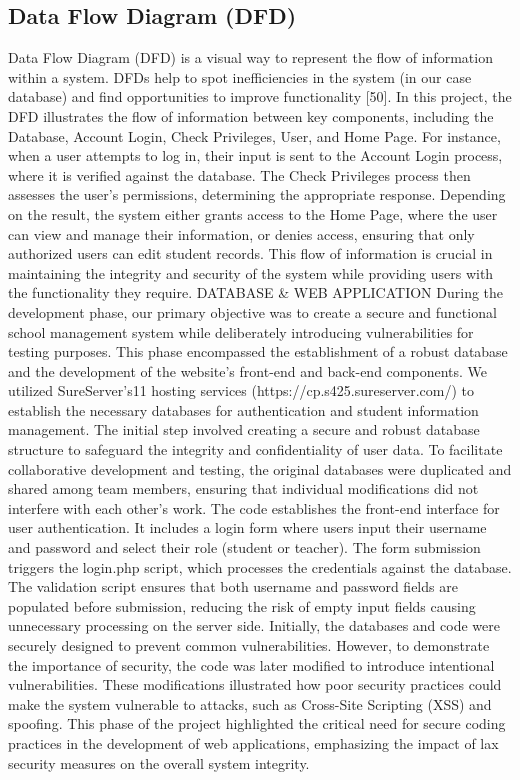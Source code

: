 \documentclass[letterpaper,twocolumn]{article}
\begin{document}
\subsection{Data Flow Diagram (DFD)}
Data Flow Diagram (DFD) is a visual way to represent the flow of information within a system. DFDs help to spot inefficiencies in the system (in our case database) and find opportunities to improve functionality [50]. In this project, the DFD illustrates the flow of information between key components, including the Database, Account Login, Check Privileges, User, and Home Page. 
For instance, when a user attempts to log in, their input is sent to the Account Login process, where it is verified against the database. The Check Privileges process then assesses the user's permissions, determining the appropriate response. Depending on the result, the system either grants access to the Home Page, where the user can view and manage their information, or denies access, ensuring that only authorized users can edit student records. This flow of information is crucial in maintaining the integrity and security of the system while providing users with the functionality they require.
DATABASE & WEB APPLICATION
During the development phase, our primary objective was to create a secure and functional school management system while deliberately introducing vulnerabilities for testing purposes. This phase encompassed the establishment of a robust database and the development of the website’s front-end and back-end components. 
We utilized SureServer's11 hosting services (https://cp.s425.sureserver.com/) to establish the necessary databases for authentication and student information management. The initial step involved creating a secure and robust database structure to safeguard the integrity and confidentiality of user data. To facilitate collaborative development and testing, the original databases were duplicated and shared among team members, ensuring that individual modifications did not interfere with each other's work.
The code establishes the front-end interface for user authentication. It includes a login form where users input their username and password and select their role (student or teacher). The form submission triggers the login.php script, which processes the credentials against the database.
The validation script ensures that both username and password fields are populated before submission, reducing the risk of empty input fields causing unnecessary processing on the server side.
Initially, the databases and code were securely designed to prevent common vulnerabilities. However, to demonstrate the importance of security, the code was later modified to introduce intentional vulnerabilities. These modifications illustrated how poor security practices could make the system vulnerable to attacks, such as Cross-Site Scripting (XSS) and spoofing. This phase of the project highlighted the critical need for secure coding practices in the development of web applications, emphasizing the impact of lax security measures on the overall system integrity.
\end{document}

